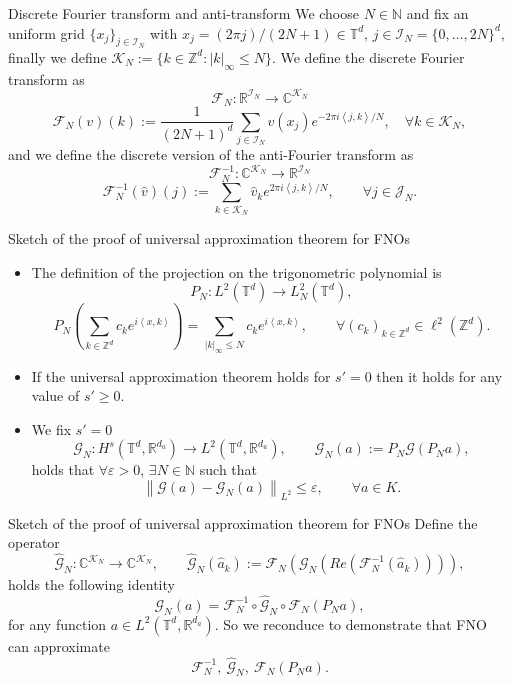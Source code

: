 \documentclass{beamer}
\newcommand{\numberset}{\mathbb}
\newcommand{\N}{\numberset{N}}
\newcommand{\Z}{\numberset{Z}}
\newcommand{\R}{\numberset{R}}
\newcommand{\C}{\numberset{C}}
\begin{document}

\begin{frame}[noframenumbering]{Discrete Fourier transform and anti-transform}
	We choose $ N \in \N $ and fix an uniform grid $ \{x_j\}_{j \in \mathcal{I}_N} $ with $ x_j = (2\pi j)/(2N+1) \in \mathbb{T}^d $, $ j \in \mathcal{I}_N = \{0, \dots, 2N\}^{d} $, finally we define $\mathcal{K}_N := \{k \in \Z^d : |k|_{\infty} \le N\}$.
	We define the discrete Fourier transform as
	\[ \mathcal{F}_{N}: \R^{\mathcal{I}_N} \to \C^{\mathcal{K}_N}\]\[ \mathcal{F}_{N}(v)(k) := \frac{1}{(2N+1)^{d}} \sum_{j \in \mathcal{I}_N}v(x_j) e^{-2\pi i \left\langle j, k \right\rangle/N }, \quad \forall k \in \mathcal{K}_N, \]
	and we define the discrete version of the anti-Fourier transform as
	\[ \mathcal{F}_{N}^{-1}: \C^{\mathcal{K}_N} \to \R^{\mathcal{I}_N}\]\[ \mathcal{F}_{N}^{-1}(\widehat{v})(j) := \sum_{k \in \mathcal{K}_N} \widehat{v}_k e^{2\pi i \left\langle j, k \right\rangle/N }, \qquad \forall j \in \mathcal{J}_N. \]
\end{frame}


\begin{frame}[noframenumbering]{Sketch of the proof of universal approximation theorem for FNOs}
	\centering
	\begin{itemize}
		\item The definition of the projection on the trigonometric polynomial is
		      \[ P_N: L^{2}(\mathbb{T}^d) \to L^{2}_N(\mathbb{T}^d),  \]
		      \[ P_N\left(\sum_{k \in \Z^d} c_k e^{i \left\langle x, k \right\rangle } \right) = \sum_{|k|_{\infty}\le N} c_k e^{i \left\langle x, k \right\rangle }, \qquad \forall (c_k)_{k \in \Z^d} \in \ell^2(\Z^d). \]
		\item If the universal approximation theorem holds for $ s'=0 $ then it holds for any value of $ s' \ge 0 $.
		\item We fix $ s' = 0 $  \[ \mathcal{G}_{N}: H^{s}(\mathbb{T}^d, \R^{d_a}) \to L^2(\mathbb{T}^d, \R^{d_u}), \qquad \mathcal{G}_{N}(a):= P_N  \mathcal{G} (P_Na), \]
		      holds that $ \forall \varepsilon > 0 $, $ \exists N \in \N $ such that
		      \[ \left\|\mathcal{G}(a) - \mathcal{G}_N(a) \right\|_{L^2} \le \varepsilon, \qquad \forall a \in K. \]
	\end{itemize}
\end{frame}


\begin{frame}[noframenumbering]{Sketch of the proof of universal approximation theorem for FNOs}
	Define the operator
	\[ \widehat{\mathcal{G}}_N: \C^{\mathcal{K}_N} \to\C^{\mathcal{K}_N}, \qquad \widehat{\mathcal{G}}_N(\widehat{a}_k) := \mathcal{F}_N (\mathcal{G}_N ( Re (\mathcal{F}_N^{-1}(\widehat{a}_k)))), \]
	holds the following identity
	\[ \mathcal{G}_N (a) = \mathcal{F}_N^{-1} \circ \widehat{\mathcal{G}}_N \circ \mathcal{F}_N (P_Na), \]
	for any function $  a \in L^2(\mathbb{T}^d, \R^{d_a}) $. So we reconduce to demonstrate that FNO can approximate	\[ \mathcal{F}_N^{-1}, \ \widehat{\mathcal{G}}_N , \ \mathcal{F}_N (P_Na). \]
\end{frame}
\end{document}
